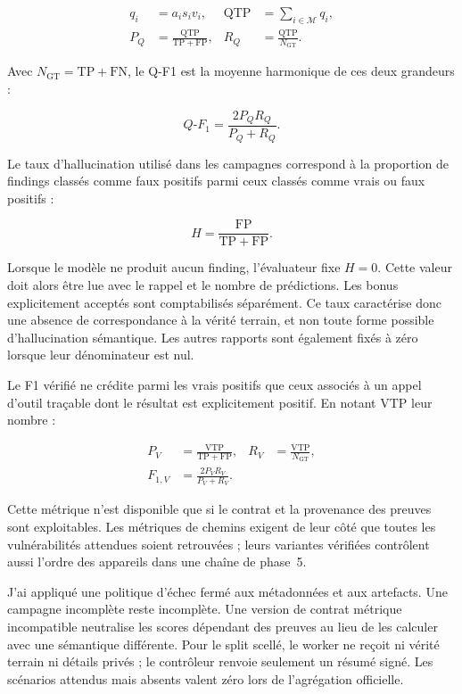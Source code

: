 \begin{align}
  q_i &= a_i s_i v_i,
  & \mathrm{QTP} &= \sum_{i\in\mathcal{M}} q_i, \\
  P_Q &= \frac{\mathrm{QTP}}{\mathrm{TP}+\mathrm{FP}},
  & R_Q &= \frac{\mathrm{QTP}}{N_{\mathrm{GT}}}.
\end{align}

Avec \(N_{\mathrm{GT}}=\mathrm{TP}+\mathrm{FN}\), le Q-F1 est la moyenne
harmonique de ces deux grandeurs :

\begin{equation}
  Q\text{-}F_1 = \frac{2P_QR_Q}{P_Q+R_Q}.
\end{equation}

Le taux d'hallucination utilisé dans les campagnes correspond à la proportion
de findings classés comme faux positifs parmi ceux classés comme vrais ou faux positifs :

\begin{equation}
  H = \frac{\mathrm{FP}}{\mathrm{TP}+\mathrm{FP}}.
\end{equation}

Lorsque le modèle ne produit aucun finding, l'évaluateur fixe \(H=0\). Cette
valeur doit alors être lue avec le rappel et le nombre de prédictions. Les bonus
explicitement acceptés sont comptabilisés séparément. Ce taux caractérise donc
une absence de correspondance à la vérité terrain, et non toute forme possible
d'hallucination sémantique. Les autres rapports sont également fixés à zéro
lorsque leur dénominateur est nul.

Le F1 vérifié ne crédite parmi les vrais positifs que ceux associés à un appel
d'outil traçable dont le résultat est explicitement positif. En notant
\(\mathrm{VTP}\) leur nombre :

\begin{align}
  P_V &= \frac{\mathrm{VTP}}{\mathrm{TP}+\mathrm{FP}},
  & R_V &= \frac{\mathrm{VTP}}{N_{\mathrm{GT}}}, \\
  F_{1,V} &= \frac{2P_VR_V}{P_V+R_V}.
\end{align}

Cette métrique n'est disponible que si le contrat et la provenance des preuves
sont exploitables. Les métriques de chemins exigent de leur côté que toutes
les vulnérabilités attendues soient retrouvées ; leurs variantes vérifiées
contrôlent aussi l'ordre des appareils dans une chaîne de phase~5.

J'ai appliqué une politique d'échec fermé aux métadonnées et aux artefacts. Une
campagne incomplète reste incomplète. Une version de contrat métrique incompatible
neutralise les scores dépendant des preuves au lieu de les calculer avec une
sémantique différente. Pour le split scellé, le worker ne reçoit ni vérité
terrain ni détails privés ; le contrôleur renvoie seulement un résumé signé. Les
scénarios attendus mais absents valent zéro lors de l'agrégation officielle.

